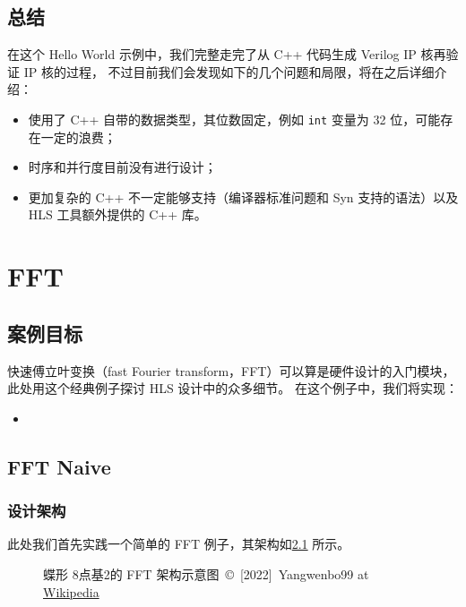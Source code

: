 \documentclass[Chinese,TC,use boldface,simple Names]{beaulivre}
\begin{document}
  \section{总结}

    在这个 Hello World 示例中，我们完整走完了从 C++ 代码生成 Verilog IP 核再验证 IP 核的过程，
    不过目前我们会发现如下的几个问题和局限，将在之后详细介绍：
    \begin{itemize}
      \item 使用了 C++ 自带的数据类型，其位数固定，例如 \texttt{int} 变量为 32 位，可能存在一定的浪费；
      \item 时序和并行度目前没有进行设计；
      \item 更加复杂的 C++ 不一定能够支持（编译器标准问题和 Syn 支持的语法）以及 HLS 工具额外提供的 C++ 库。
    \end{itemize}

\chapter{FFT}

  \section{案例目标}

    快速傅立叶变换（fast Fourier transform，FFT）可以算是硬件设计的入门模块，
    此处用这个经典例子探讨 HLS 设计中的众多细节。
    在这个例子中，我们将实现：
    \begin{itemize}
      \item {}
    \end{itemize}

  \section{FFT Naive}

    \subsection{设计架构}

      此处我们首先实践一个简单的 FFT 例子，其架构如\cref{fig:DIT-FFT-butterfly} 所示。
      \begin{figure}[htbp]
        \centering
        
        \caption{蝶形 8点基2的 FFT 架构示意图~\copyright~[2022]~Yangwenbo99 at \href{https://en.wikipedia.org/wiki/File:DIT-FFT-butterfly.svg}{Wikipedia}}
        \label{fig:DIT-FFT-butterfly}
      \end{figure}
\end{document}

